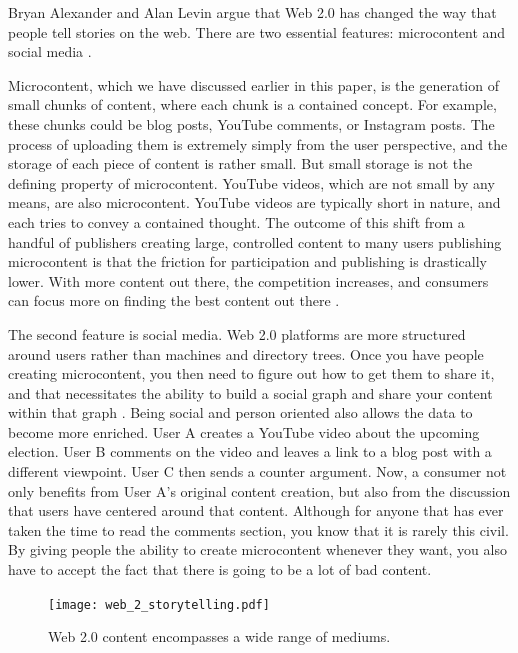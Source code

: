 \documentclass[12pt]{article}
\begin{document}
Bryan Alexander and Alan Levin argue that Web 2.0 has changed the way that people tell stories on the web.  There are two essential features: microcontent and social media \cite{web_2_storytelling}.

Microcontent, which we have discussed earlier in this paper, is the generation of small chunks of content, where each chunk is a contained concept.  For example, these chunks could be blog posts, YouTube comments, or Instagram posts.  The process of uploading them is extremely simply from the user perspective, and the storage of each piece of content is rather small.  But small storage is not the defining property of microcontent.  YouTube videos, which are not small by any means, are also microcontent.  YouTube videos are typically short in nature, and each tries to convey a contained thought.  The outcome of this shift from a handful of publishers creating large, controlled content to many users publishing microcontent is that the friction for participation and publishing is drastically lower.  With more content out there, the competition increases, and consumers can focus more on finding the best content out there \cite{web_2_storytelling}.

The second feature is social media.  Web 2.0 platforms are more structured around users rather than machines and directory trees.  Once you have people creating microcontent, you then need to figure out how to get them to share it, and that necessitates the ability to build a social graph and share your content within that graph \cite{web_2_storytelling}.  Being social and person oriented also allows the data to become more enriched.  User A creates a YouTube video about the upcoming election.  User B comments on the video and leaves a link to a blog post with a different viewpoint.  User C then sends a counter argument.  Now, a consumer not only benefits from User A's original content creation, but also from the discussion that users have centered around that content.  Although for anyone that has ever taken the time to read the comments section, you know that it is rarely this civil.  By giving people the ability to create microcontent whenever they want, you also have to accept the fact that there is going to be a lot of bad content.

\begin{figure}[H]
  \begin{center}
    \texttt{[image: web\_2\_storytelling.pdf]}
    \caption{Web 2.0 content encompasses a wide range of mediums.}
    \label{fig:web_2_storytelling}
  \end{center}
\end{figure}
\end{document}
